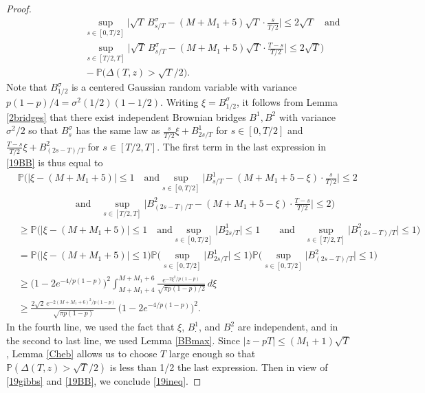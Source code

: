 \begin{proof}
\begin{equation}
\begin{split}
	&\qquad\qquad\qquad\sup_{s\in[0,T/2]}\Big|\sqrt{T}\,B^\sigma_{s/T}-(M+M_1+5)\sqrt{T}\cdot\frac{s}{T/2}\Big| \leq 2\sqrt{T}\quad\mathrm{and}\\
	&\qquad\qquad\qquad \sup_{s\in[T/2,T]}\Big|\sqrt{T}\,B^\sigma_{s/T}-(M+M_1+5)\sqrt{T}\cdot\frac{T-s}{T/2}\Big| \leq 2\sqrt{T} \Big)\\
	&\qquad\qquad\qquad -  \mathbb{P}\Big(\Delta(T,z) > \sqrt{T}/2\Big).
	\end{split}
	\end{equation}
	Note that $B^\sigma_{1/2}$ is a centered Gaussian random variable with variance $p(1-p)/4 = \sigma^2(1/2)(1-1/2)$. Writing $\xi = B^\sigma_{1/2}$, it follows from Lemma \ref{2bridges} that there exist independent Brownian bridges $B^1,B^2$ with variance $\sigma^2/2$ so that $B^\sigma_s$ has the same law as $\frac{s}{T/2}\xi + B^1_{2s/T}$ for $s\in[0,T/2]$ and $\frac{T-s}{T/2}\xi + B^2_{(2s-T)/T}$ for $s\in[T/2,T]$. The first term in the last expression in \eqref{19BB} is thus equal to
	\begin{align*}
	&\mathbb{P}\Big(|\xi - (M+M_1+5)|\leq 1 \quad\mathrm{and} \sup_{s\in[0,T/2]}\Big|B^1_{s/T}-(M+M_1+5-\xi)\cdot\frac{s}{T/2}\Big| \leq 2\\
	&\qquad\qquad\qquad \mathrm{and}\quad \sup_{s\in[T/2,T]}\Big|B^2_{(2s-T)/T}-(M+M_1+5-\xi)\cdot\frac{T-s}{T/2}\Big| \leq 2 \Big)\\
	&\geq \mathbb{P}\Big(|\xi - (M+M_1+5)|\leq 1 \quad\mathrm{and} \sup_{s\in[0,T/2]}\big|B^1_{2s/T}\big| \leq 1 \qquad \mathrm{and}\quad \sup_{s\in[T/2,T]}\big|B^2_{(2s-T)/T}\big| \leq 1 \Big)\\
	&= \mathbb{P}\Big(|\xi-(M+M_1+5)|\leq 1\Big)\mathbb{P}\Big(\sup_{s\in[0,T/2]} \big|B^1_{2s/T}\big|\leq 1\Big)\mathbb{P}\Big(\sup_{s\in[0,T/2]} \big|B^2_{(2s-T)/T}\big|\leq 1\Big)\\
	&\geq \big(1-2e^{-4/p(1-p)}\big)^2 \int_{M+M_1+4}^{M+M_1+6} \frac{e^{-2\xi^2/p(1-p)}}{\sqrt{\pi p(1-p)/2}}\,d\xi\\
	&\geq \frac{2\sqrt{2}\,e^{-2(M+M_1+6)^2/p(1-p)}}{\sqrt{\pi p(1-p)}}\,\big(1-2e^{-4/p(1-p)}\big)^2.
	\end{align*}
	In the fourth line, we used the fact that $\xi$, $B^1_\cdot$, and $B^2_\cdot$ are independent, and in the second to last line, we used Lemma \ref{BBmax}. Since $|z-pT|\leq (M_1+1)\sqrt{T}$, Lemma \ref{Cheb} allows us to choose $T$ large enough so that $\mathbb{P}(\Delta(T,z) > \sqrt{T}/2)$ is less than 1/2 the last expression. Then in view of \eqref{19gibbs} and \eqref{19BB}, we conclude \eqref{19ineq}.
	
\end{proof}
